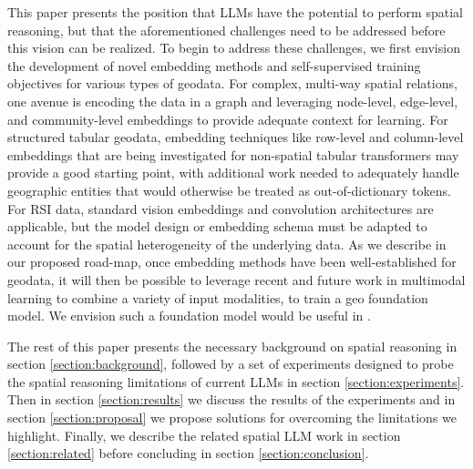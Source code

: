 This paper presents the position that LLMs have the potential to perform spatial reasoning, but that the aforementioned challenges need to be addressed before this vision can be realized.
%
To begin to address these challenges, we first envision the development of novel embedding methods and self-supervised training objectives for various types of geodata.
%
For complex, multi-way spatial relations, one avenue is encoding the data in a graph and leveraging node-level, edge-level, and community-level embeddings to provide adequate context for learning.
For structured tabular geodata, embedding techniques like row-level and column-level embeddings that are being investigated for non-spatial tabular transformers may provide a good starting point, with additional work needed to adequately handle geographic entities that would otherwise be treated as out-of-dictionary tokens.
For RSI data, standard vision embeddings and convolution architectures are applicable, but the model design or embedding schema must be adapted to account for the spatial heterogeneity of the underlying data.
%
As we describe in our proposed road-map, once embedding methods have been well-established for geodata, it will then be possible to leverage recent and future work in multimodal learning to combine a variety of input modalities, to train a geo foundation model.
%
We envision such a foundation model would be useful in .

The rest of this paper presents the necessary background on spatial reasoning in section \ref{section:background}, followed by a set of experiments designed to probe the spatial reasoning limitations of current LLMs in section \ref{section:experiments}.
Then in section \ref{section:results} we discuss the results of the experiments and in section \ref{section:proposal} we propose solutions for overcoming the limitations we highlight.
Finally, we describe the related spatial LLM work in section \ref{section:related} before concluding in section \ref{section:conclusion}. 




